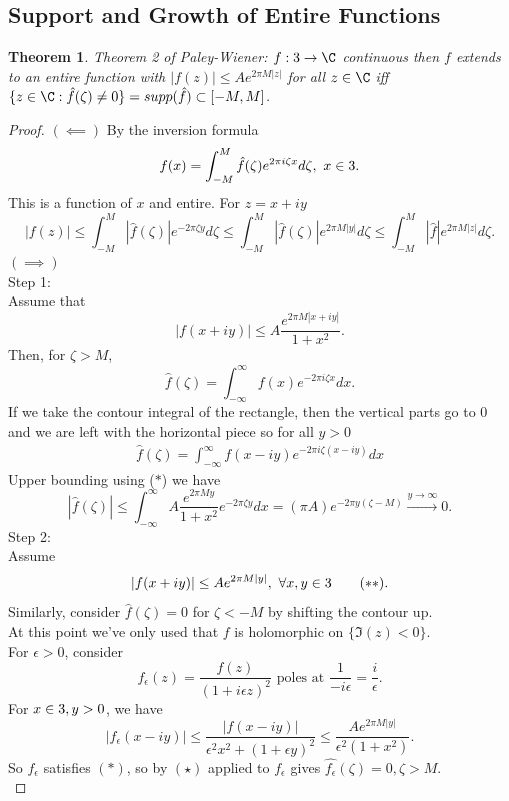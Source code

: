 \documentclass[a4paper]{article}
\newtheorem{thm}{Theorem}[section]
\begin{document}
\subsection{Support and Growth of Entire Functions}
\begin{thm}
    Theorem 2 of Paley-Wiener: $f:\R\to \C$ continuous then $f$ extends to an entire function with $|f(z)|\leq Ae^{2\pi M|z|}$ for all $z\in \C$ iff $ \{z\in \C:\hat{f}(\zeta)\neq 0\}=supp(\hat{f})\subset [-M,M]$.
\end{thm}
\begin{proof}
    $(\impliedby)$ By the inversion formula 
    \[
    f(x)=\int_{-M}^M \hat{f}(\zeta)e^{2\pi i \zeta x}d\zeta, \text{ } x\in 3
    .\] 
    This is a function of $x$ and entire. For $z=x+iy$
    \[
    |f(z)|\leq \int_{-M}^M |\hat{f}(\zeta)|e^{-2\pi \zeta y}d\zeta\leq \int_{-M}^M |\hat{f}(\zeta)|e^{2\pi M|y|}d\zeta\leq \int_{-M}^M |\hat{f}|e^{2\pi M|z|}d\zeta
    .\] 
    $(\implies)$ \\
    Step 1: \\
    Assume that 
    \[
    |f(x+iy)|\leq A \frac{e^{2\pi M|x+iy|}}{1+x^2} \tag{$*$}
    .\] 
    Then, for $\zeta>M$,
    \[
    \hat{f}(\zeta)=\int_{-\infty}^\infty f(x)e^{-2\pi i \zeta x}dx
    .\] 
    If we take the contour integral of the rectangle, then the vertical parts go to $0$ and we are left with the horizontal piece so for all $y>0$
    \begin{align*}
        \hat{f}(\zeta)=\int_{-\infty}^{\infty}f(x-iy)e^{-2\pi i \zeta (x-iy)}dx
    \end{align*}
    Upper bounding using ($*$) we have 
    \[
    |\hat{f}(\zeta)|\leq \int_{-\infty}^{\infty}A \frac{e^{2\pi M y}}{1+x^2}e^{-2\pi \zeta y}dx = (\pi A)e^{-2\pi y(\zeta-M)}\xrightarrow{y\to \infty} 0 \tag{$\star$}
    .\] 
    Step 2: \\
    Assume 
    \[
    |f(x+iy)|\leq Ae^{2\pi M |y|}, \text{ } \forall x,y\in 3 \tag{$**$}
    .\] 
    Similarly, consider $\hat{f}(\zeta)=0$ for $\zeta<-M$ by shifting the contour up. \\
    At this point we've only used that $f$ is holomorphic on $ \{\Im(z)<0\}$. \\
    For $\epsilon>0$, consider 
    \[
    f_\epsilon(z)= \frac{f(z)}{(1+i\epsilon z)^2} \text{ poles at } \frac{1}{-i\epsilon}=\frac{i}{\epsilon}
    .\] 
    For $x\in 3,y>0$, we have 
    \[
    |f_\epsilon(x-iy)|\leq \frac{|f(x-iy)|}{\epsilon^2x^2+(1+\epsilon y)^2}\leq \frac{A e^{2\pi M |y|}}{\epsilon^2(1+x^2)}
    .\] 
    So $f_\epsilon$ satisfies $(*)$, so by $(\star)$ applied to $f_\epsilon$ gives $\hat{f_\epsilon}(\zeta)=0, \zeta>M$. \\

\end{proof}
\end{document}
